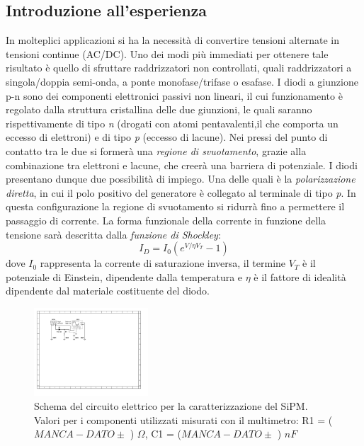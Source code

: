 \documentclass[journal]{IEEEtran}
\begin{document}
\subsection{\textbf{Introduzione all'esperienza}}
In molteplici applicazioni si ha la necessità di convertire tensioni alternate in tensioni continue (AC/DC). Uno dei modi più immediati per ottenere tale risultato è quello di sfruttare raddrizzatori non controllati, quali raddrizzatori a singola/doppia semi-onda, a ponte monofase/trifase o esafase.
I diodi a giunzione p-n sono dei componenti elettronici passivi non lineari, il cui funzionamento è regolato dalla struttura cristallina delle due giunzioni, le quali saranno rispettivamente di tipo \textit{n} (drogati con atomi pentavalenti,il che comporta un eccesso di elettroni) e di tipo \textit{p} (eccesso di lacune). Nei pressi del punto di contatto tra le due si formerà una \textit{regione di svuotamento}, grazie alla combinazione tra elettroni e lacune, che creerà una barriera di potenziale. I diodi presentano dunque due possibilità di impiego. Una delle quali è la \textit{polarizzazione diretta}, in cui il polo positivo del generatore è collegato al terminale di
tipo \textit{p}. In questa configurazione la regione di svuotamento si ridurrà fino a permettere il passaggio di corrente. La forma funzionale della corrente in funzione della tensione sarà descritta dalla \textit{funzione di Shockley}: \[I_{D} = I_{0}(e^{V/\eta V_T}-1)\] dove $I_{0}$ rappresenta la corrente di saturazione inversa, il termine $V_{T}$ è il potenziale di Einstein, dipendente dalla temperatura e $\eta$ è il fattore di idealità dipendente dal materiale costituente del diodo.
\begin{figure}[H]%
\begin{center}
\includegraphics[width=0.38\textwidth]{sch-simulations/output/Diode-rectifier.pdf}
\caption{Schema del circuito elettrico per la caratterizzazione del SiPM. Valori per i componenti utilizzati misurati con il multimetro: R1 = ( $MANCA-DATO\pm$ ) $\Omega$, C1 = ($MANCA-DATO\pm$ ) $nF$}
\label{fig:diode-rectifier}
\end{center}
\end{figure}
\end{document}
